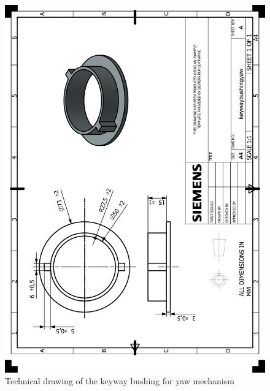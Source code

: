 \documentclass[12pt]{article}
\begin{document}
\begin{appendices}
\begin{figure}[H]
    \centering
    \includegraphics[width=\textwidth]{HP_keywaybushingyaw.png} 
    \caption{Technical drawing of the keyway bushing for yaw mechanism}
    \label{fig:technical-drawing}
\end{figure}


\end{appendices}
\end{document}
